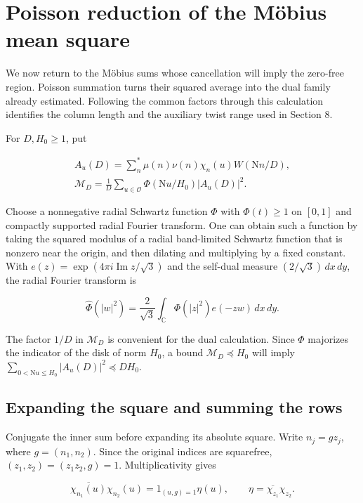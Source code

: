 \documentclass[reqno,a4paper,11pt]{amsart}
\begin{document}
\section{Poisson reduction of the Möbius mean square}

We now return to the Möbius sums whose cancellation will imply the zero-free region. Poisson summation turns their squared average into the dual family already estimated. Following the common factors through this calculation identifies the column length and the auxiliary twist range used in Section 8.

For $D,H_0\ge1$, put

\begin{equation}\label{eq:21}
\begin{gathered}
A_u(D)=\sum_n^*\mu(n)\nu(n)\chi_n(u)W(\mathrm{N}n/D), \\ \mathcal{M}_D=\frac{1}{D}\sum_{u\in\mathcal{O}}\Phi(\mathrm{N}u/H_0)|A_u(D)|^2.
\end{gathered}
\end{equation}

Choose a nonnegative radial Schwartz function $\Phi$ with $\Phi(t)\ge1$ on $[0,1]$ and compactly supported radial Fourier transform. One can obtain such a function by taking the squared modulus of a radial band-limited Schwartz function that is nonzero near the origin, and then dilating and multiplying by a fixed constant. With $e(z)=\exp(4\pi i\operatorname{Im}z/\sqrt{3})$ and the self-dual measure $(2/\sqrt{3})\,dx\,dy$, the radial Fourier transform is

\[
\widehat{\Phi}(|w|^2)=\frac{2}{\sqrt{3}}\int_{\mathbb{C}}\Phi(|z|^2)e(-zw)\,dx\,dy.
\]

The factor $1/D$ in $\mathcal{M}_D$ is convenient for the dual calculation. Since $\Phi$ majorizes the indicator of the disk of norm $H_0$, a bound $\mathcal{M}_D\preccurlyeq H_0$ will imply $\sum_{0<\mathrm{N}u\le H_0}|A_u(D)|^2\preccurlyeq DH_0$.

\subsection*{Expanding the square and summing the rows}

Conjugate the inner sum before expanding its absolute square. Write $n_j=gz_j$, where $g=(n_1,n_2)$. Since the original indices are squarefree, $(z_1,z_2)=(z_1z_2,g)=1$. Multiplicativity gives

\[
\overline{\chi_{n_1}(u)}\chi_{n_2}(u)=1_{(u,g)=1}\eta(u),\qquad\eta=\overline{\chi_{z_1}}\chi_{z_2}.
\]
\end{document}
